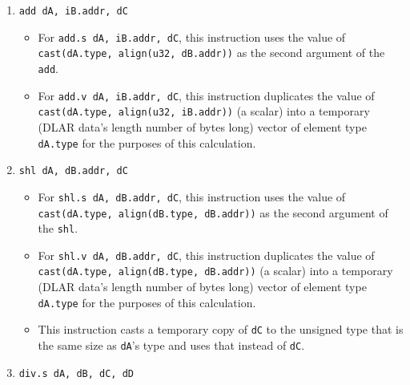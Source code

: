 \documentclass{article}
\begin{document}
\begin{itemize}
\begin{enumerate}
			\item \texttt{add dA, iB.addr, dC}
				\begin{itemize}
				\item For \texttt{add.s dA, iB.addr, dC}, this instruction
					uses the value of
					\texttt{cast(dA.type, align(u32, dB.addr))}
					as the second argument of the \texttt{add}.
				\item For \texttt{add.v dA, iB.addr, dC}, this instruction
					duplicates the value of
					\texttt{cast(dA.type, align(u32, iB.addr))}
					(a scalar) into a temporary (DLAR data's length number
					of bytes long) vector of element type \texttt{dA.type}
					for the purposes of this calculation.
				\end{itemize}
			\item \texttt{shl dA, dB.addr, dC}
				\begin{itemize}
				\item For \texttt{shl.s dA, dB.addr, dC}, this instruction
					uses the value of
					\texttt{cast(dA.type, align(dB.type, dB.addr))}
					as the second argument of the \texttt{shl}.
				\item For \texttt{shl.v dA, dB.addr, dC}, this instruction
					duplicates the value of
					\texttt{cast(dA.type, align(dB.type, dB.addr))}
					(a scalar) into a temporary (DLAR data's length number
					of bytes long) vector of element type \texttt{dA.type}
					for the purposes of this calculation.
				\item This instruction casts a temporary copy of
					\texttt{dC} to the unsigned type that is the same size
					as \texttt{dA}'s type and uses that instead of
					\texttt{dC}.
				\end{itemize}
			\item \texttt{div.s dA, dB, dC, dD}
				\begin{itemize}

\end{itemize}
\end{enumerate}
\end{itemize}
\end{document}
